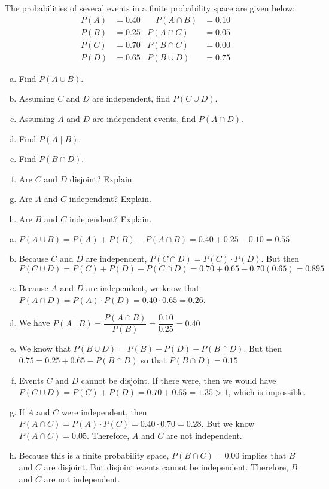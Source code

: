 \documentclass[11pt,letterpaper]{article}
\begin{document}

 The probabilities of several events in a finite probability space are given below:
	\[
	\begin{aligned}
	P(A)&= 0.40 &\quad P(A \cap B)&= 0.10 \\
	P(B)&= 0.25 & P(A \cap C)&= 0.05 \\
	P(C)&= 0.70 & P(B \cap C)&= 0.00 \\
	P(D)&= 0.65 & P(B \cup D)&= 0.75
	\end{aligned}
	\] 
\begin{enumerate}[(a)]
\item Find $P(A \cup B)$. 
\item Assuming $C$ and $D$ are independent, find $P(C \cup D)$. 
\item Assuming $A$ and $D$ are independent events, find $P(A \cap D)$.
\item Find $P(A \;|\; B)$.
\item Find $P(B \cap D)$. 
\item Are $C$ and $D$ disjoint? Explain.
\item Are $A$ and $C$ independent? Explain.
\item Are $B$ and $C$ independent? Explain.
\end{enumerate} \pspace

\sol 
\begin{enumerate}[(a)]
\item $P(A \cup B)= P(A) + P(B) - P(A \cap B)= 0.40 + 0.25 - 0.10= 0.55$

\item Because $C$ and $D$ are independent, $P(C \cap D)= P(C) \cdot P(D)$. But then $P(C \cup D)= P(C) + P(D) - P(C \cap D)= 0.70 + 0.65 - 0.70(0.65)= 0.895$

\item Because $A$ and $D$ are independent, we know that $P(A \cap D)= P(A) \cdot P(D)= 0.40 \cdot 0.65= 0.26$.

\item We have $P(A \;|\;B)= \dfrac{P(A \cap B)}{P(B)}= \dfrac{0.10}{0.25}= 0.40$

\item We know that $P(B \cup D)= P(B) + P(D) - P(B \cap D)$. But then $0.75= 0.25 + 0.65 - P(B \cap D)$ so that $P(B \cap D)= 0.15$

\item Events $C$ and $D$ cannot be disjoint. If there were, then we would have $P(C \cup D)= P(C) + P(D)= 0.70 + 0.65= 1.35 > 1$, which is impossible. 

\item If $A$ and $C$ were independent, then $P(A \cap C)= P(A) \cdot P(C)= 0.40 \cdot 0.70= 0.28$. But we know $P(A \cap C)= 0.05$. Therefore, $A$ and $C$ are not independent. 

\item Because this is a finite probability space, $P(B \cap C)= 0.00$ implies that $B$ and $C$ are disjoint. But disjoint events cannot be independent. Therefore, $B$ and $C$ are not independent. 
\end{enumerate}
\end{document}
